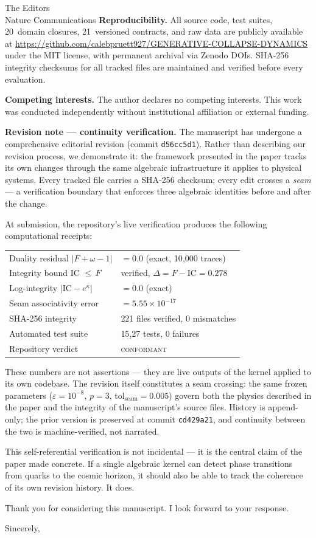 \documentclass[11pt]{letter}
\begin{document}
\begin{letter}{The Editors\\Nature Communications}
\textbf{Reproducibility.} All source code, test suites,
20~domain closures, 21~versioned contracts, and raw data are
publicly available at
\url{https://github.com/calebpruett927/GENERATIVE-COLLAPSE-DYNAMICS}
under the MIT license, with permanent archival via Zenodo DOIs.
SHA-256 integrity checksums for all tracked files are maintained
and verified before every evaluation.

\textbf{Competing interests.} The author declares no competing
interests. This work was conducted independently without
institutional affiliation or external funding.

\textbf{Revision note --- continuity verification.}
The manuscript has undergone a comprehensive editorial revision
(commit \texttt{d56cc5d1}).
Rather than describing our revision process, we demonstrate it:
the framework presented in the paper tracks its own changes
through the same algebraic infrastructure it applies to physical
systems. Every tracked file carries a SHA-256 checksum; every
edit crosses a \emph{seam} --- a verification boundary that
enforces three algebraic identities before and after the change.

At submission, the repository's live verification produces the
following computational receipts:

\smallskip
\begin{tabular}{@{}ll@{}}
  Duality residual $|F + \omega - 1|$ & $= 0.0$ (exact, 10{,}000 traces) \\
  Integrity bound IC $\leq\,F$        & verified, $\Delta = F - \text{IC} = 0.278$ \\
  Log-integrity $|\text{IC} - e^{\kappa}|$ & $= 0.0$ (exact) \\
  Seam associativity error             & $= 5.55 \times 10^{-17}$ \\
  SHA-256 integrity                    & 221 files verified, 0 mismatches \\
  Automated test suite                 & 15{,}27 tests, 0 failures \\
  Repository verdict                   & \textsc{conformant}
\end{tabular}
\smallskip

These numbers are not assertions --- they are live outputs of the
kernel applied to its own codebase. The revision itself constitutes
a seam crossing: the same frozen parameters ($\varepsilon = 10^{-8}$,
$p = 3$, tol$_{\mathrm{seam}} = 0.005$) govern both the physics
described in the paper and the integrity of the manuscript's source
files. History is append-only; the prior version is preserved at
commit \texttt{cd429a21}, and continuity between the two is
machine-verified, not narrated.

This self-referential verification is not incidental --- it is the
central claim of the paper made concrete. If a single algebraic
kernel can detect phase transitions from quarks to the cosmic
horizon, it should also be able to track the coherence of its own
revision history. It does.

Thank you for considering this manuscript. I look forward to your
response.

\closing{Sincerely,}

\end{letter}
\end{document}
